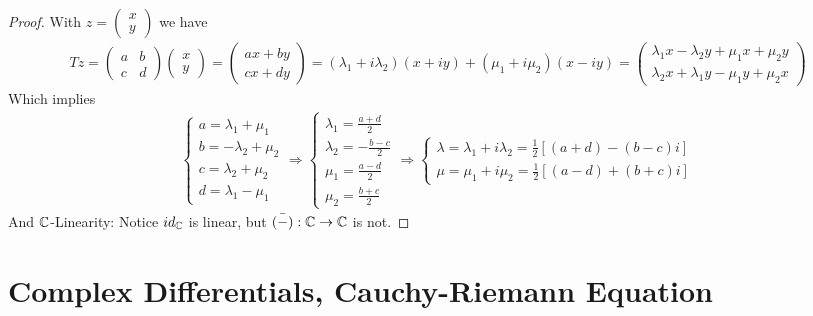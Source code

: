 \documentclass[Total.tex]{subfiles}
\begin{document}
				\begin{proof}
					With $z=\begin{pmatrix}
						x\\
						y
					\end{pmatrix}$ we have
					\begin{gather*}
						Tz=\begin{pmatrix}
							a&b\\
							c&d
						\end{pmatrix}\begin{pmatrix}
							x\\
							y
						\end{pmatrix}=\begin{pmatrix}
							ax+by\\
							cx+dy
						\end{pmatrix}=(\lambda_1+i\lambda_2)(x+iy)+(\mu_1+i\mu_2)(x-iy)=\begin{pmatrix}
							\lambda_1 x-\lambda_2y+\mu_1x+\mu_2y\\
							\lambda_2 x+\lambda_1 y-\mu_1 y+\mu_2 x
						\end{pmatrix}
					\end{gather*}
					Which implies
					\begin{gather*}
						\begin{cases}
							a=\lambda_1+\mu_1\\
							b=-\lambda_2+\mu_2\\
							c=\lambda_2+\mu_2\\
							d=\lambda_1-\mu_1
						\end{cases}\Rightarrow \begin{cases}
							\lambda_1=\frac{a+d}{2}\\
							\lambda_2=-\frac{b-c}{2}\\
							\mu_1=\frac{a-d}{2}\\
							\mu_2=\frac{b+c}{2}
						\end{cases}\Rightarrow \begin{cases}
							\lambda=\lambda_1+i\lambda_2=\frac{1}{2}[(a+d)-(b-c)i]\\
							\mu=\mu_1+i\mu_2=\frac{1}{2}[(a-d)+(b+c)i]
						\end{cases}
					\end{gather*}
					And $\mathbb{C}$-Linearity: Notice $id_{\mathbb{C}}$ is linear, but $\bar{(-)}:\mathbb{C}\rightarrow \mathbb{C}$ is not.
				\end{proof}
		\section{Complex Differentials, Cauchy-Riemann Equation}
\end{document}
